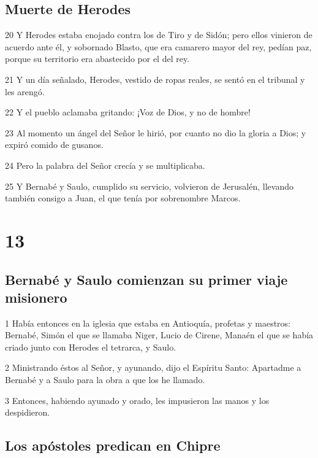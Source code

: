 \section*{Muerte de Herodes}

\par 20 Y Herodes estaba enojado contra los de Tiro y de Sidón; pero ellos vinieron de acuerdo ante él, y sobornado Blasto, que era camarero mayor del rey, pedían paz, porque su territorio era abastecido por el del rey.
\par 21 Y un día señalado, Herodes, vestido de ropas reales, se sentó en el tribunal y les arengó.
\par 22 Y el pueblo aclamaba gritando: ¡Voz de Dios, y no de hombre!
\par 23 Al momento un ángel del Señor le hirió, por cuanto no dio la gloria a Dios; y expiró comido de gusanos.
\par 24 Pero la palabra del Señor crecía y se multiplicaba.
\par 25 Y Bernabé y Saulo, cumplido su servicio, volvieron de Jerusalén, llevando también consigo a Juan, el que tenía por sobrenombre Marcos.

\chapter{13}

\section*{Bernabé y Saulo comienzan su primer viaje misionero}

\par 1 Había entonces en la iglesia que estaba en Antioquía, profetas y maestros: Bernabé, Simón el que se llamaba Niger, Lucio de Cirene, Manaén el que se había criado junto con Herodes el tetrarca, y Saulo.
\par 2 Ministrando éstos al Señor, y ayunando, dijo el Espíritu Santo: Apartadme a Bernabé y a Saulo para la obra a que los he llamado.
\par 3 Entonces, habiendo ayunado y orado, les impusieron las manos y los despidieron.

\section*{Los apóstoles predican en Chipre}


